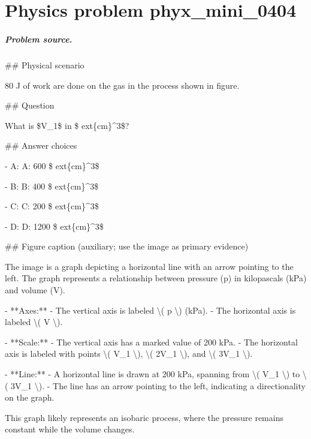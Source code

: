 
\chapter{Physics problem phyx\_mini\_0404}
\label{ch:PhyXMiniProblems_problem_phyx_mini_0404}

\paragraph{Problem source.}
\#\# Physical scenario

80 J of work are done on the gas in the process shown in figure.

\#\# Question

What is \$V\_1\$ in \$	ext\{cm\}\textasciicircum{}3\$?

\#\# Answer choices

- A: A: 600 \$	ext\{cm\}\textasciicircum{}3\$

- B: B: 400 \$	ext\{cm\}\textasciicircum{}3\$

- C: C: 200 \$	ext\{cm\}\textasciicircum{}3\$

- D: D: 1200 \$	ext\{cm\}\textasciicircum{}3\$

\#\# Figure caption (auxiliary; use the image as primary evidence)

The image is a graph depicting a horizontal line with an arrow pointing to the left. The graph represents a relationship between pressure (p) in kilopascals (kPa) and volume (V). 

- **Axes:**
  - The vertical axis is labeled \textbackslash{}( p \textbackslash{}) (kPa).
  - The horizontal axis is labeled \textbackslash{}( V \textbackslash{}).

- **Scale:**
  - The vertical axis has a marked value of 200 kPa.
  - The horizontal axis is labeled with points \textbackslash{}( V\_1 \textbackslash{}), \textbackslash{}( 2V\_1 \textbackslash{}), and \textbackslash{}( 3V\_1 \textbackslash{}).

- **Line:**
  - A horizontal line is drawn at 200 kPa, spanning from \textbackslash{}( V\_1 \textbackslash{}) to \textbackslash{}( 3V\_1 \textbackslash{}).
  - The line has an arrow pointing to the left, indicating a directionality on the graph.

This graph likely represents an isobaric process, where the pressure remains constant while the volume changes.

